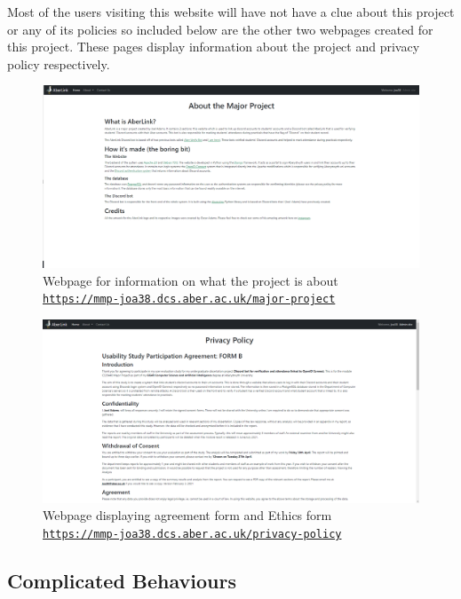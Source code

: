 Most of the users visiting this website will have not have a clue about this project or any of its policies so included below are the other two webpages created for this project. These pages display information about the project and privacy policy respectively.

\begin{figure}[H]
	\centering
	\includegraphics[width=1\linewidth]{Figures/website-mmp.png}
	\caption{Webpage for information on what the project is about \\\centering\href{https://mmp-joa38.dcs.aber.ac.uk/major-project}{\nolinkurl{https://mmp-joa38.dcs.aber.ac.uk/major-project}}}
	\label{fig:final-web-mmp}
\end{figure}

\begin{figure}[H]
	\centering
	\includegraphics[width=1\linewidth]{Figures/website-privacy-policy.png}
	\caption{Webpage displaying agreement form and Ethics form \\\centering\href{https://mmp-joa38.dcs.aber.ac.uk/privacy-policy}{\nolinkurl{https://mmp-joa38.dcs.aber.ac.uk/privacy-policy}}}
	\label{fig:final-web-privacy-policy}
\end{figure}

\subsection{Complicated Behaviours}

